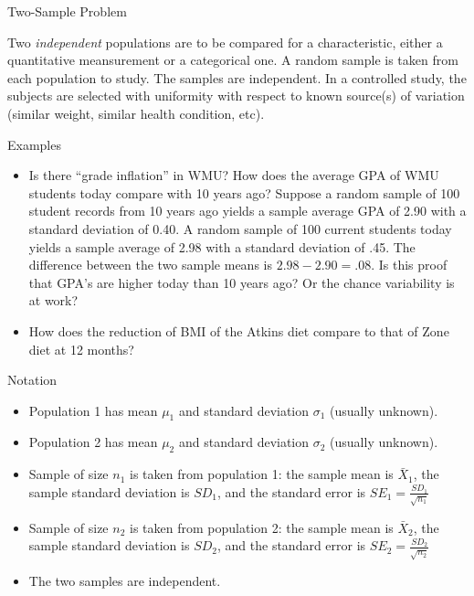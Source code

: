 \documentclass[14pt]{beamer}\usepackage[]{graphicx}\usepackage[]{color}
\begin{document}
\begin{frame}[fragile]{Two-Sample Problem}

Two \textit{independent} populations are to be compared for a characteristic,  either a quantitative meansurement or a categorical one.  A random  sample is taken from each population to study.  The samples are  independent.  In a controlled study, the subjects are selected with  uniformity with respect to known source(s) of variation (similar weight, similar health condition, etc).
\end{frame}

\begin{frame}[fragile]{Examples}

{\small{
\begin{itemize}
\item Is there ``grade inflation'' in WMU? How does the average GPA of  WMU students today compare with 10 years ago? Suppose a  random sample of 100 student records from 10 years ago yields a  sample average GPA of 2.90 with a standard deviation of 0.40.  A  random sample of 100 current students today yields a sample average of 2.98 with a standard deviation of .45. The difference  between the two sample means is $2.98 - 2.90 = .08$. Is this proof  that GPA's are higher today than 10 years ago?  Or the chance  variability is at work?
\item How does the reduction of BMI of the Atkins diet compare to that  of Zone diet at 12 months?
\end{itemize}
}}
\end{frame}

\begin{frame}[fragile]{Notation}

\begin{itemize}
\item<1-> Population 1 has mean $\mu_1$ and standard deviation $\sigma_1$ (usually  unknown).
\item<2-> Population 2 has mean $\mu_2$ and standard deviation $\sigma_2$ (usually  unknown).
\item<3-> Sample of size $n_1$ is taken from population 1: the sample mean is $\bar{X}_1$, the sample standard deviation is $SD_1$, and the standard error is $SE_1 = \frac{SD_1}{\sqrt{n_1}}$  
\item<4-> Sample of size $n_2$ is taken from population 2: the sample mean is $\bar{X}_2$, the sample standard deviation is $SD_2$, and the standard error is $SE_2 = \frac{SD_2}{\sqrt{n_2}}$
\item<5-> The two samples are independent.
\end{itemize}
\end{frame}
\end{document}
